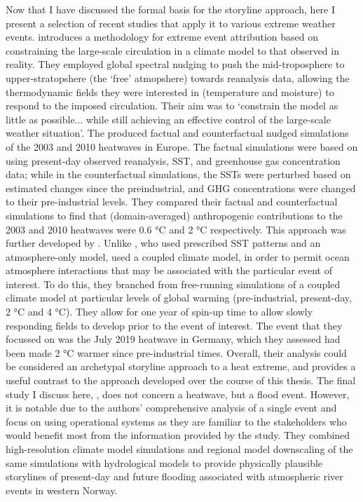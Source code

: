     Now that I have discussed the formal basis for the storyline approach, here I present a selection of recent studies that apply it to various extreme weather events. \citet{van_garderen_methodology_2021} introduces a methodology for extreme event attribution based on constraining the large-scale circulation in a climate model to that observed in reality. They employed global spectral nudging to push the mid-troposphere to upper-stratopshere (the `free' atmopshere) towards reanalysis data, allowing the thermodynamic fields they were interested in (temperature and moisture) to respond to the imposed circulation. Their aim was to `constrain the model as little as possible... while still achieving an effective control of the large-scale weather situation'. The produced factual and counterfactual nudged simulations of the 2003 and 2010 heatwaves in Europe. The factual simulations were based on using present-day observed reanalysis, SST, and greenhouse gas concentration data; while in the counterfactual simulations, the SSTs were perturbed based on estimated changes since the preindustrial, and GHG concentrations were changed to their pre-industrial levels. They compared their factual and counterfactual simulations to find that (domain-averaged) anthropogenic contributions to the 2003 and 2010 heatwaves were 0.6 °C and 2 °C respectively. This approach was further developed by \citet{benitez_july_2022}. Unlike \citet{van_garderen_methodology_2021}, who used prescribed SST patterns and an atmosphere-only model, \citeauthor{benitez_july_2022} used a coupled climate model, in order to permit ocean atmosphere interactions that may be associated with the particular event of interest. To do this, they branched from free-running simulations of a coupled climate model at particular levels of global warming (pre-industrial, present-day, 2 °C and 4 °C). They allow for one year of spin-up time to allow slowly responding fields to develop prior to the event of interest. The event that they focussed on was the July 2019 heatwave in Germany, which they assessed had been made 2 °C warmer since pre-industrial times. Overall, their analysis could be considered an archetypal storyline approach to a heat extreme, and provides a useful contrast to the approach developed over the course of this thesis. The final study I discuss here, \citet{schaller_role_2020}, does not concern a heatwave, but a flood event. However, it is notable due to the authors' comprehensive analysis of a single event and focus on using operational systems as they are familiar to the stakeholders who would benefit most from the information provided by the study. They combined high-resolution climate model simulations and regional model downscaling of the same simulations with hydrological models to provide physically plausible storylines of present-day and future flooding associated with atmospheric river events in western Norway. 
    
